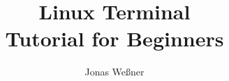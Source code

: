 \documentclass{article}
\begin{document}
\title{Linux Terminal \textendash\\
  Tutorial for Beginners}
\author{Jonas Weßner}
\maketitle
\tableofcontents
\newpage				%

\newpage
\newpage
\newpage
\newpage
\newpage
\newpage
\newpage
\newpage
\newpage

\end{document}
